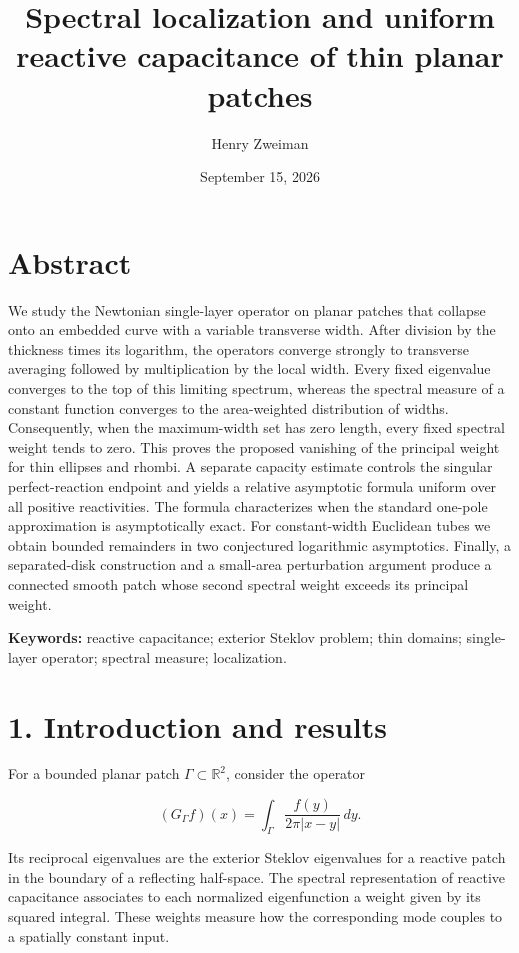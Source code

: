 \documentclass[11pt]{article}
\title{Spectral localization and uniform reactive capacitance of thin planar patches}
\author{Henry Zweiman}
\date{September 15, 2026}
\begin{document}
\maketitle
\section{Abstract}\label{abstract}

We study the Newtonian single-layer operator on planar patches that
collapse onto an embedded curve with a variable transverse width. After
division by the thickness times its logarithm, the operators converge
strongly to transverse averaging followed by multiplication by the local
width. Every fixed eigenvalue converges to the top of this limiting
spectrum, whereas the spectral measure of a constant function converges
to the area-weighted distribution of widths. Consequently, when the
maximum-width set has zero length, every fixed spectral weight tends to
zero. This proves the proposed vanishing of the principal weight for
thin ellipses and rhombi. A separate capacity estimate controls the
singular perfect-reaction endpoint and yields a relative asymptotic
formula uniform over all positive reactivities. The formula
characterizes when the standard one-pole approximation is asymptotically
exact. For constant-width Euclidean tubes we obtain bounded remainders
in two conjectured logarithmic asymptotics. Finally, a separated-disk
construction and a small-area perturbation argument produce a connected
smooth patch whose second spectral weight exceeds its principal weight.

\textbf{Keywords:} reactive capacitance; exterior Steklov problem; thin
domains; single-layer operator; spectral measure; localization.

\section{1. Introduction and results}\label{introduction-and-results}

For a bounded planar patch \(\Gamma\subset\mathbb R^2\), consider the
operator

\[
(G_\Gamma f)(x)=\int_\Gamma\frac{f(y)}{2\pi|x-y|}\,dy.
\tag{1.1}
\]

Its reciprocal eigenvalues are the exterior Steklov eigenvalues for a
reactive patch in the boundary of a reflecting half-space. The spectral
representation of reactive capacitance associates to each normalized
eigenfunction a weight given by its squared integral. These weights
measure how the corresponding mode couples to a spatially constant
input.
\end{document}

